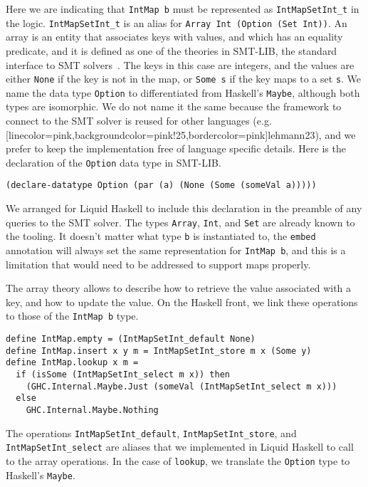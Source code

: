 \documentclass[sigconf, anonymous, review]{acmart}
\newcommand{\improvement}[1]{\todo[linecolor=pink,backgroundcolor=pink!25,bordercolor=pink]{#1}}
\renewcommand{\todo}{}
\newcommand{\improvement}[1]{{}}
\newcommand{\tc}[1]{{\small\texttt{#1}}}
\begin{document}
Here we are indicating that \tc{IntMap b} must be represented as \tc{IntMapSetInt\_t}
in the logic. \tc{IntMapSetInt\_t} is an alias for \tc{Array Int (Option (Set Int))}.
An array is an entity that associates keys with values, and which has an equality predicate,
and it is defined as one of the theories in SMT-LIB, the standard interface
to SMT solvers~\cite{BarFT-RR-25}.
The keys in this case are integers, and the values are either \tc{None} if the key
is not in the map, or \tc{Some s} if the key maps to a set \tc{s}. We name the data type
\tc{Option} to differentiated from Haskell's \tc{Maybe}, although both types are isomorphic.
We do not name it the same because the framework to connect to the SMT solver is
reused for other languages (e.g. \improvement{lehmann23}), and we prefer to keep
the implementation free of language specific details.
Here is the declaration of the \tc{Option} data type in SMT-LIB.

\begin{verbatim}
(declare-datatype Option (par (a) (None (Some (someVal a)))))
\end{verbatim}

We arranged for Liquid Haskell to include this declaration in the preamble of any
queries to the SMT solver. The types \tc{Array}, \tc{Int}, and \tc{Set} are already
known to the tooling.
It doesn't matter what type \tc{b} is instantiated to, the \tc{embed} annotation will
always set the same representation for \tc{IntMap b}, and this is a limitation that
would need to be addressed to support maps properly.

The array theory allows to describe how to retrieve the value associated with
a key, and how to update the value. On the Haskell front, we link these operations
to those of the \tc{IntMap b} type.

\begin{verbatim}
define IntMap.empty = (IntMapSetInt_default None)
define IntMap.insert x y m = IntMapSetInt_store m x (Some y)
define IntMap.lookup x m =
  if (isSome (IntMapSetInt_select m x)) then
    (GHC.Internal.Maybe.Just (someVal (IntMapSetInt_select m x)))
  else
    GHC.Internal.Maybe.Nothing
\end{verbatim}

The operations \tc{IntMapSetInt\_default}, \tc{IntMapSetInt\_store}, and \tc{IntMapSetInt\_select}
are aliases that we implemented in Liquid Haskell to call to the array operations.
In the case of \tc{lookup}, we translate the \tc{Option} type to Haskell's \tc{Maybe}.
\end{document}
